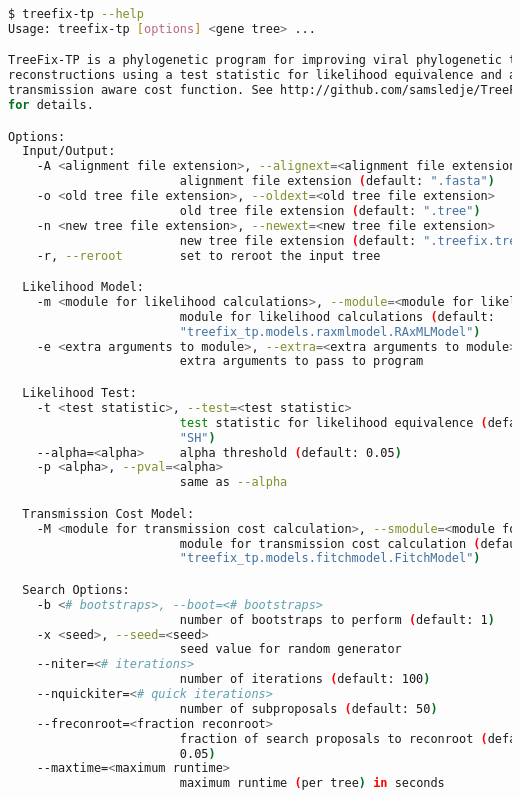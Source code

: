 \documentclass[11pt]{article}
\begin{document}
\begin{lstlisting}[language=Bash]
$ treefix-tp --help
Usage: treefix-tp [options] <gene tree> ...

TreeFix-TP is a phylogenetic program for improving viral phylogenetic tree
reconstructions using a test statistic for likelihood equivalence and a
transmission aware cost function. See http://github.com/samsledje/TreeFix-TP
for details.

Options:
  Input/Output:
    -A <alignment file extension>, --alignext=<alignment file extension>
                        alignment file extension (default: ".fasta")
    -o <old tree file extension>, --oldext=<old tree file extension>
                        old tree file extension (default: ".tree")
    -n <new tree file extension>, --newext=<new tree file extension>
                        new tree file extension (default: ".treefix.tree")
    -r, --reroot        set to reroot the input tree

  Likelihood Model:
    -m <module for likelihood calculations>, --module=<module for likelihood calculations>
                        module for likelihood calculations (default:
                        "treefix_tp.models.raxmlmodel.RAxMLModel")
    -e <extra arguments to module>, --extra=<extra arguments to module>
                        extra arguments to pass to program

  Likelihood Test:
    -t <test statistic>, --test=<test statistic>
                        test statistic for likelihood equivalence (default:
                        "SH")
    --alpha=<alpha>     alpha threshold (default: 0.05)
    -p <alpha>, --pval=<alpha>
                        same as --alpha

  Transmission Cost Model:
    -M <module for transmission cost calculation>, --smodule=<module for transmission cost calculation>
                        module for transmission cost calculation (default:
                        "treefix_tp.models.fitchmodel.FitchModel")

  Search Options:
    -b <# bootstraps>, --boot=<# bootstraps>
                        number of bootstraps to perform (default: 1)
    -x <seed>, --seed=<seed>
                        seed value for random generator
    --niter=<# iterations>
                        number of iterations (default: 100)
    --nquickiter=<# quick iterations>
                        number of subproposals (default: 50)
    --freconroot=<fraction reconroot>
                        fraction of search proposals to reconroot (default:
                        0.05)
    --maxtime=<maximum runtime>
                        maximum runtime (per tree) in seconds


\end{lstlisting}
\end{document}
